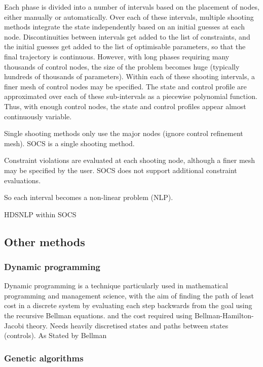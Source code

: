 Each phase is divided into a number of intervals based on the placement of nodes, either manually or automatically.
Over each of these intervals, multiple shooting methods integrate the state independently based on an initial guesses at each node. Discontinuities between intervals get added to the list of constraints, and the initial guesses get added to the list of optimisable parameters, so that the final trajectory is continuous. However, with long phases requiring many thousands of control nodes, the size of the problem becomes huge (typically hundreds of thousands of parameters). Within each of these shooting intervals, a finer mesh of control nodes may be specified. The state and control profile are approximated over each of these sub-intervals as a piecewise polynomial function. Thus, with enough control nodes, the state and control profiles appear almost continuously variable.

Single shooting methods only use the major nodes (ignore control refinement mesh). SOCS is a single shooting method.

Constraint violations are evaluated at each shooting node, although a finer mesh may be specified by the user. SOCS does not support additional constraint evaluations.

So each interval becomes a non-linear problem (NLP).

HDSNLP within SOCS

\subsection{Other methods}

\subsubsection{Dynamic programming}

Dynamic programming is a technique particularly used in mathematical programming and management science, with the aim of finding the path of least cost in a discrete system by evaluating each step backwards from the goal using the recursive Bellman equations. and the cost required using Bellman-Hamilton-Jacobi theory. Needs heavily discretised states and paths between states (controls). As Stated by Bellman

\subsubsection{Genetic algorithms}

